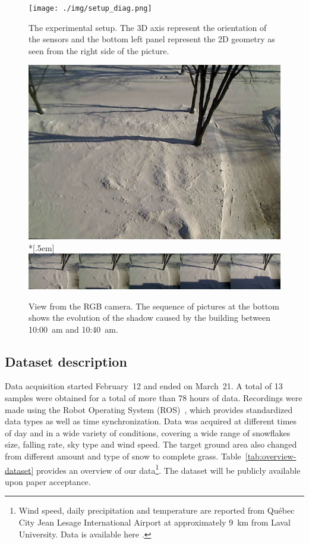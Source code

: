 \begin{figure}[th]
    \centering
    \texttt{[image: ./img/setup\_diag.png]}
    \caption{The experimental setup. The 3D axis represent the orientation of the sensors and the bottom left panel represent the 2D geometry as seen from the right side of the picture.}
    \label{fig:setup}
\end{figure}

\begin{figure}[th]
    \centering
    \includegraphics[width=0.90\linewidth]{./img/camera_view.jpg}\\*[.5em]
    \includegraphics[width=0.90\linewidth]{./img/shadow2.png}
    \caption{View from the RGB camera. The sequence of pictures at the bottom shows the evolution of the shadow caused by the building between 10:00~am and 10:40~am.}
    \label{fig:view}
\end{figure}

\subsection{Dataset description} %
Data acquisition started February~12 and ended on March~21. A total of 13 samples were obtained for a total of more than 78 hours of data. Recordings were made using the Robot Operating System (ROS)~\cite{ROSWeb}, which provides standardized data types as well as time synchronization. Data was acquired at different times of day and in a wide variety of conditions, covering a wide range of snowflakes size, falling rate, sky type and wind speed. The target ground area also changed from different amount and type of snow to complete grass. Table~\ref{tab:overview-dataset} provides an overview of our data\footnote{Wind speed, daily precipitation and temperature are reported from Québec City Jean Lesage International Airport at approximately \SI{9}{\km} from Laval University. Data is available here \cite{WeatherCanada}.}. The dataset will be publicly available upon paper acceptance.

